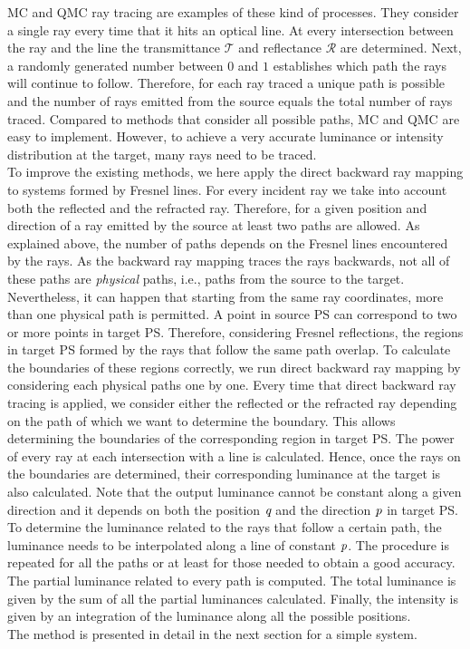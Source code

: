 MC and QMC ray tracing are examples of these kind of processes. They consider a single ray every time that it hits an optical line. At every intersection between the ray and the line the transmittance $\mathcal{T}$ and reflectance $\mathcal{R}$ are determined. Next, a randomly generated number between $0$ and $1$ establishes which path the rays will continue to follow. 
Therefore, for each ray traced a unique path is possible and the number of rays emitted from the source equals the total number of rays traced. Compared to methods that consider all possible paths, MC and QMC are easy to implement. However, to achieve a very accurate luminance or intensity distribution at the target, many rays need to be traced.
\\ \indent 
To improve the existing methods, we here apply the direct backward ray mapping to systems formed by Fresnel lines. For every incident ray we take into account both the reflected and the refracted ray. Therefore, for a given position and direction of a ray emitted by the source at least two paths are allowed. As explained above, the number of paths depends on the Fresnel lines encountered by the rays. As the backward ray mapping traces the rays backwards, not all of these paths are \textit{physical} paths, i.e., paths from the source to the target. Nevertheless, it can happen that starting from the same ray coordinates, more than one physical path is permitted. A point in source PS can correspond to two or more points in target PS. Therefore, considering Fresnel reflections, the regions in target PS formed by the rays that follow the same path overlap. To calculate the boundaries of these regions correctly, we run direct backward ray mapping by considering each physical paths one by one. Every time that direct backward ray tracing is applied, we consider either the reflected or the refracted ray depending on the path of which we want to determine the boundary. This allows determining the boundaries of the corresponding region in target PS. The power of every ray at each intersection with a line is calculated. Hence, once the rays on the boundaries are determined, their corresponding luminance at the target is also calculated. Note that the output luminance cannot be constant along a given direction and it depends on both the position $\textit{q}$ and the direction $\textit{p}$ in target PS. To determine the luminance related to the rays that follow a certain path, the luminance needs to be interpolated along a line of constant $\textit{p}$. The procedure is repeated for all the paths or at least for those needed to obtain a good accuracy. The partial luminance related to every path is computed.
The total luminance is given by the sum of all the partial luminances calculated.
Finally, the intensity is given by an integration of the luminance along all the possible positions.
\\ \indent
The method is presented in detail in the next section for a simple system.
